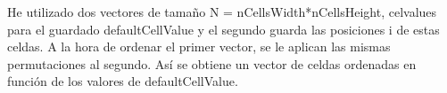 He utilizado dos vectores de tamaño N = nCellsWidth*nCellsHeight, celvalues para el guardado defaultCellValue y el segundo guarda las posiciones i de estas celdas. A la hora de ordenar el primer vector, se le aplican las mismas permutaciones al segundo. Así se obtiene un vector de celdas ordenadas en función de los valores de defaultCellValue.

